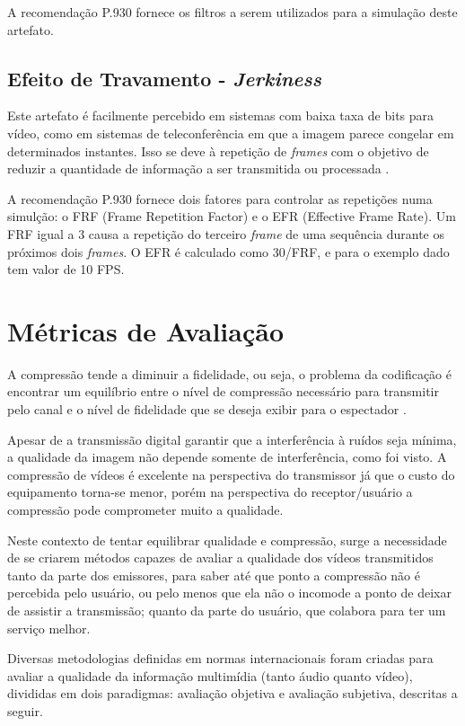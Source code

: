 A recomendação P.930 fornece os filtros a serem utilizados para a simulação deste artefato.

\subsection{Efeito de Travamento - \emph{Jerkiness}}

Este artefato é facilmente percebido em sistemas com baixa taxa de bits para vídeo, como em sistemas de teleconferência \cite{itup930} em que a imagem parece congelar em determinados instantes. Isso se deve à repetição de \emph{frames} com o objetivo de reduzir a quantidade de informação a ser transmitida ou processada \cite{itup930}.

A recomendação P.930 fornece dois fatores para controlar as repetições numa simulção: o FRF (Frame Repetition Factor) e o EFR (Effective Frame Rate). Um FRF igual a 3 causa a repetição do terceiro \emph{frame} de uma sequência durante os próximos dois \emph{frames}. O EFR é calculado como 30/FRF, e para o exemplo dado tem valor de 10 FPS.

\section{Métricas de Avaliação}

A compressão tende a diminuir a fidelidade, ou seja, o problema da codificação é encontrar um equilíbrio entre o nível de compressão necessário para transmitir pelo canal e o nível de fidelidade que se deseja exibir para o espectador \cite{daronco}.

Apesar de a transmissão digital garantir que a interferência à ruídos seja mínima, a qualidade da imagem não depende somente de interferência, como foi visto. A compressão de vídeos é excelente na perspectiva do transmissor já que o custo do equipamento torna-se menor, porém na perspectiva do receptor/usuário a compressão pode comprometer muito a qualidade.

Neste contexto de tentar equilibrar qualidade e compressão, surge a necessidade de se criarem métodos capazes de avaliar a qualidade dos vídeos transmitidos tanto da parte dos emissores, para saber até que ponto a compressão não é percebida pelo usuário, ou pelo menos que ela não o incomode a ponto de deixar de assistir a transmissão; quanto da parte do usuário, que colabora para ter um serviço melhor.

Diversas metodologias definidas em normas internacionais foram criadas para avaliar a qualidade da informação multimídia (tanto áudio quanto vídeo), divididas em dois paradigmas: avaliação objetiva e avaliação subjetiva, descritas a seguir.

